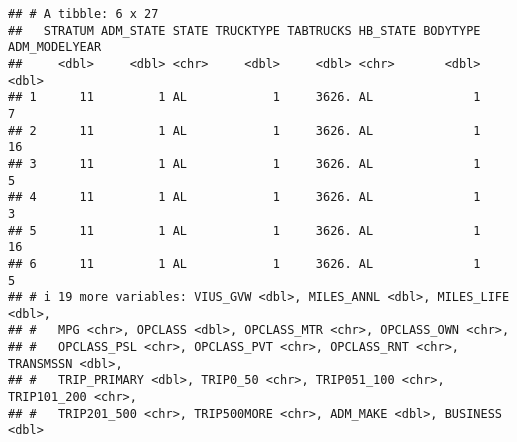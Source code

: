 \documentclass[
]{article}
\begin{document}
\begin{verbatim}
## # A tibble: 6 x 27
##   STRATUM ADM_STATE STATE TRUCKTYPE TABTRUCKS HB_STATE BODYTYPE ADM_MODELYEAR
##     <dbl>     <dbl> <chr>     <dbl>     <dbl> <chr>       <dbl>         <dbl>
## 1      11         1 AL            1     3626. AL              1             7
## 2      11         1 AL            1     3626. AL              1            16
## 3      11         1 AL            1     3626. AL              1             5
## 4      11         1 AL            1     3626. AL              1             3
## 5      11         1 AL            1     3626. AL              1            16
## 6      11         1 AL            1     3626. AL              1             5
## # i 19 more variables: VIUS_GVW <dbl>, MILES_ANNL <dbl>, MILES_LIFE <dbl>,
## #   MPG <chr>, OPCLASS <dbl>, OPCLASS_MTR <chr>, OPCLASS_OWN <chr>,
## #   OPCLASS_PSL <chr>, OPCLASS_PVT <chr>, OPCLASS_RNT <chr>, TRANSMSSN <dbl>,
## #   TRIP_PRIMARY <dbl>, TRIP0_50 <chr>, TRIP051_100 <chr>, TRIP101_200 <chr>,
## #   TRIP201_500 <chr>, TRIP500MORE <chr>, ADM_MAKE <dbl>, BUSINESS <dbl>
\end{verbatim}
\end{document}
